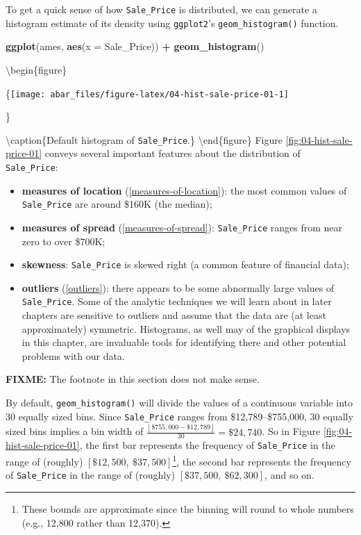 \documentclass[]{book}
\newenvironment{Shaded}{\begin{snugshade}}{\end{snugshade}}
\newcommand{\DataTypeTok}[1]{\textcolor[rgb]{0.13,0.29,0.53}{#1}}
\newcommand{\KeywordTok}[1]{\textcolor[rgb]{0.13,0.29,0.53}{\textbf{#1}}}
\newcommand{\NormalTok}[1]{#1}
\newcommand{\OperatorTok}[1]{\textcolor[rgb]{0.81,0.36,0.00}{\textbf{#1}}}
\newcommand{\StringTok}[1]{\textcolor[rgb]{0.31,0.60,0.02}{#1}}
\providecommand{\tightlist}{%
  \setlength{\itemsep}{0pt}\setlength{\parskip}{0pt}}
\let\rmarkdownfootnote\footnote%
\def\footnote{\protect\rmarkdownfootnote}
\theoremstyle{definition}
\theoremstyle{definition}
\theoremstyle{definition}
\theoremstyle{remark}
\begin{document}
To get a quick sense of how \texttt{Sale\_Price} is distributed, we can
generate a histogram estimate of its density using \texttt{ggplot2}'s
\texttt{geom\_histogram()} function.

\begin{Shaded}
\begin{Highlighting}[]
\KeywordTok{ggplot}\NormalTok{(ames, }\KeywordTok{aes}\NormalTok{(}\DataTypeTok{x =}\NormalTok{ Sale_Price)) }\OperatorTok{+}
\StringTok{  }\KeywordTok{geom_histogram}\NormalTok{()}
\end{Highlighting}
\end{Shaded}

\textbackslash{}begin\{figure\}

\{\centering \texttt{[image: abar\_files/figure-latex/04-hist-sale-price-01-1]}

\}

\textbackslash{}caption\{Default histogram of
\texttt{Sale\_Price}.\}\label{fig:04-hist-sale-price-01}
\textbackslash{}end\{figure\} Figure \ref{fig:04-hist-sale-price-01}
conveys several important features about the distribution of
\texttt{Sale\_Price}:

\begin{itemize}
\tightlist
\item
  \textbf{measures of location} (\ref{measures-of-location}): the most
  common values of \texttt{Sale\_Price} are around \$160K (the median);
\item
  \textbf{measures of spread} (\ref{measures-of-spread}):
  \texttt{Sale\_Price} ranges from near zero to over \$700K;
\item
  \textbf{skewness}: \texttt{Sale\_Price} is skewed right (a common
  feature of financial data);
\item
  \textbf{outliers} (\ref{outliers}): there appears to be some
  abnormally large values of \texttt{Sale\_Price}. Some of the analytic
  techniques we will learn about in later chapters are sensitive to
  outliers and assume that the data are (at least approximately)
  symmetric. Histograms, as well may of the graphical displays in this
  chapter, are invaluable tools for identifying there and other
  potential problems with our data.
\end{itemize}

\textbf{FIXME:} The footnote in this section does not make sense.

By default, \texttt{geom\_histogram()} will divide the values of a
continuous variable into 30 equally sized bins. Since
\texttt{Sale\_Price} ranges from \$12,789--\$755,000, 30 equally sized
bins implies a bin width of
\(\frac{\left\lfloor{\$755,000 - \$12,789}\right\rfloor}{30} = \$24,740\).
So in Figure \ref{fig:04-hist-sale-price-01}, the first bar represents
the frequency of \texttt{Sale\_Price} in the range of (roughly)
\(\left[\$12,500, \ \$37,500\right]\)\footnote{These bounds are
  approximate since the binning will round to whole numbers (e.g.,
  12,800 rather than 12,370).}, the second bar represents the frequency
of \texttt{Sale\_Price} in the range of (roughly)
\(\left[\$37,500, \ \$62,300\right]\), and so on.
\end{document}
